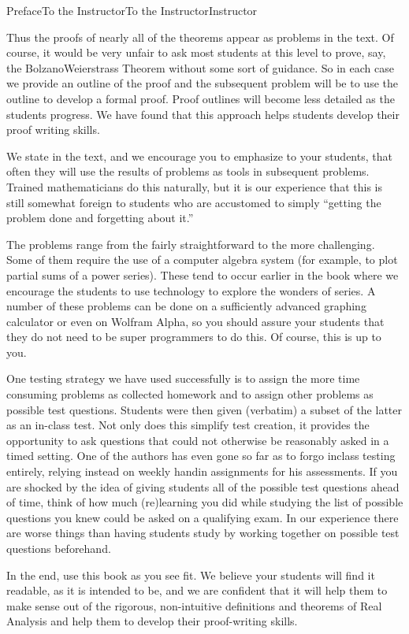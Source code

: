 \documentclass[oneside,10pt,]{book}
\numberwithin{equation}{part}
\begin{document}
\begin{preface}{Preface}{To the Instructor}{}{To the Instructor}{}{}{Instructor}
\par
Thus the proofs of nearly all of the theorems appear as problems in the text.  Of course, it would be very unfair to ask most students at this level to prove, say, the Bolzano\textendash{}Weierstrass Theorem without some sort of guidance.  So in each case we provide an outline of the proof and the subsequent problem will be to use the outline to develop a formal proof.  Proof outlines will become less detailed as the students progress.  We have found that this approach helps students develop their proof writing skills.%
\par
We state in the text, and we encourage you to emphasize to your students, that often they will use the results of problems as tools in subsequent problems.  Trained mathematicians do this naturally, but it is our experience that this is still somewhat foreign to students who are accustomed to simply ``getting the problem done and forgetting about it.''%
\par
The problems range from the fairly straightforward to the more challenging.  Some of them require the use of a computer algebra system (for example, to plot partial sums of a power series). These tend to occur earlier in the book where we encourage the students to use technology to explore the wonders of series.  A number of these problems can be done on a sufficiently advanced graphing calculator or even on Wolfram Alpha, so you should assure your students that they do not need to be super programmers to do this.  Of course, this is up to you.%
\par
One testing strategy we have used successfully is to assign the more time consuming problems as collected homework and to assign other problems as possible test questions.  Students were then given (verbatim) a subset of the latter as an in-class test. Not only does this simplify test creation, it provides the opportunity to ask questions that could not otherwise be reasonably asked in a timed setting. One of the authors has even gone so far as to forgo in\textendash{}class testing entirely, relying instead on weekly hand\textendash{}in assignments for his assessments.  If you are shocked by the idea of giving students all of the possible test questions ahead of time, think of how much (re)learning you did while studying the list of possible questions you knew could be asked on a qualifying exam.  In our experience there are worse things than having students study by working together on possible test questions beforehand.%
\par
In the end, use this book as you see fit.  We believe your students will find it readable, as it is intended to be, and we are confident that it will help them to make sense out of the rigorous, non-intuitive definitions and theorems of Real Analysis and help them to develop their proof-writing skills.%

\end{preface}
\end{document}
